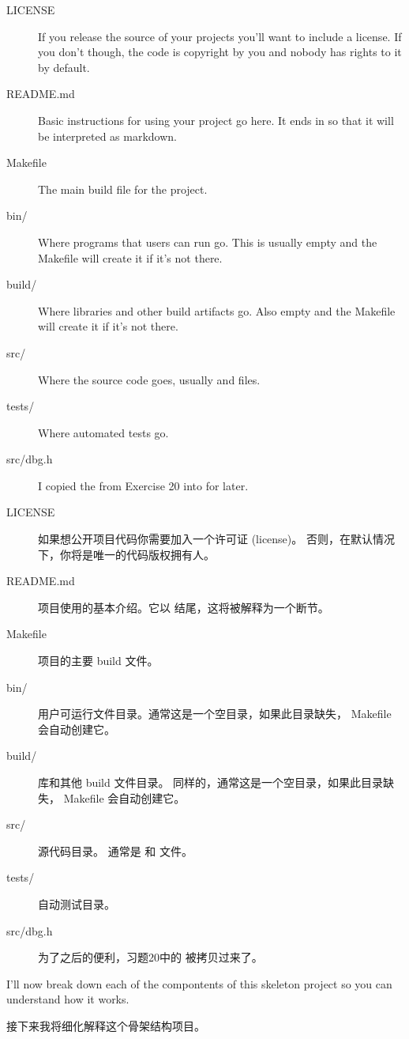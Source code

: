 \begin{description}
\item[LICENSE] If you release the source of your projects you'll want to 
    include a license.  If you don't though, the code is copyright by you
    and nobody has rights to it by default.
\item[README.md] Basic instructions for using your project go here.  It ends
    in  so that it will be interpreted as markdown.
\item[Makefile] The main build file for the project.
\item[bin/] Where programs that users can run go. This is usually empty and the Makefile will create it if it's not there.
\item[build/] Where libraries and other build artifacts go. Also empty and the Makefile will create it if it's not there.
\item[src/] Where the source code goes, usually  and  files.
\item[tests/] Where automated tests go.
\item[src/dbg.h] I copied the  from Exercise 20 into  for later.
\end{description}

\begin{description}
\item[LICENSE] 如果想公开项目代码你需要加入一个许可证 (license)。 否则，在默认情况下，你将是唯一的代码版权拥有人。
\item[README.md] 项目使用的基本介绍。它以  结尾，这将被解释为一个断节。
\item[Makefile] 项目的主要 build 文件。
\item[bin/] 用户可运行文件目录。通常这是一个空目录，如果此目录缺失， Makefile 会自动创建它。
\item[build/] 库和其他 build 文件目录。 同样的，通常这是一个空目录，如果此目录缺失， Makefile 会自动创建它。
\item[src/] 源代码目录。 通常是  和  文件。
\item[tests/] 自动测试目录。
\item[src/dbg.h] 为了之后的便利，习题20中的  被拷贝过来了。
\end{description}

I'll now break down each of the compontents of this skeleton project
so you can understand how it works.

接下来我将细化解释这个骨架结构项目。

